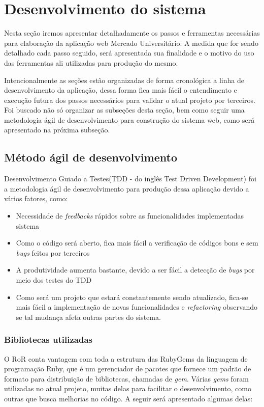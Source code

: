 \chapter{Desenvolvimento do sistema}
\label{chap:etapas_desenvolvimento}

Nesta seção iremos apresentar detalhadamente os passos e ferramentas necessárias para elaboração da aplicação web Mercado Universitário. A medida que for sendo detalhado cada passo seguido, será apresentada sua finalidade e o motivo do uso das ferramentas ali utilizadas para produção do mesmo. \par
Intencionalmente as seções estão organizadas de forma cronológica a linha de desenvolvimento da aplicação, dessa forma fica mais fácil o entendimento e execução futura dos passos necessários para validar o atual projeto por terceiros. Foi buscado não só organizar as subseções desta seção, bem como seguir uma metodologia ágil de desenvolvimento para construção do sistema web, como será apresentado na próxima subseção.

\section{Método ágil de desenvolvimento}
\label{section:tdd}

Desenvolvimento Guiado a Testes(TDD - do inglês Test Driven Development) foi a metodologia ágil de desenvolvimento para produção dessa aplicação devido a vários fatores, como:
\begin{itemize}  
\item Necessidade de \textit{feedbacks} rápidos sobre as funcionalidades implementadas sistema
\item Como o código será aberto, fica mais fácil a verificação de códigos bons e sem \textit{bugs} feitos por terceiros
\item A produtividade aumenta bastante, devido a ser fácil a detecção de \textit{bugs} por meio dos testes do TDD
\item Como será um projeto que estará constantemente sendo atualizado, fica-se mais fácil a implementação de novas funcionalidades e \textit{refactoring} observando se tal mudança afeta outras partes do sistema.
\end{itemize}

\subsection{Bibliotecas utilizadas}
O RoR conta vantagem com toda a estrutura das RubyGems da linguagem de programação Ruby, que é um gerenciador de pacotes que fornece um padrão de formato para distribuição de bibliotecas, chamadas de \textit{gem}. Várias \textit{gems} foram utilizadas no atual projeto, muitas delas para facilitar o desenvolvimento, como outras que busca melhorias no código. A seguir será apresentado algumas delas:
